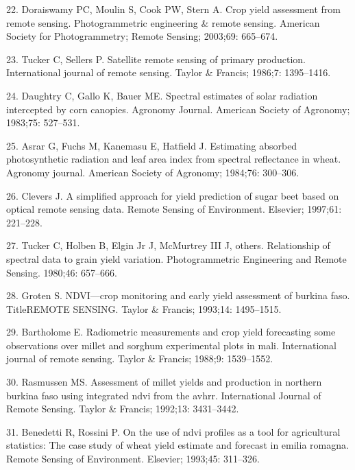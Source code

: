 \documentclass[10pt,letterpaper]{article}
\begin{document}
\hypertarget{ref-doraiswamy2003crop}{}
22. Doraiswamy PC, Moulin S, Cook PW, Stern A. Crop yield assessment
from remote sensing. Photogrammetric engineering \& remote sensing.
American Society for Photogrammetry; Remote Sensing; 2003;69: 665--674.

\hypertarget{ref-tucker1986satellite}{}
23. Tucker C, Sellers P. Satellite remote sensing of primary production.
International journal of remote sensing. Taylor \& Francis; 1986;7:
1395--1416.

\hypertarget{ref-daughtry1983spectral}{}
24. Daughtry C, Gallo K, Bauer ME. Spectral estimates of solar radiation
intercepted by corn canopies. Agronomy Journal. American Society of
Agronomy; 1983;75: 527--531.

\hypertarget{ref-asrar1984estimating}{}
25. Asrar G, Fuchs M, Kanemasu E, Hatfield J. Estimating absorbed
photosynthetic radiation and leaf area index from spectral reflectance
in wheat. Agronomy journal. American Society of Agronomy; 1984;76:
300--306.

\hypertarget{ref-clevers1997simplified}{}
26. Clevers J. A simplified approach for yield prediction of sugar beet
based on optical remote sensing data. Remote Sensing of Environment.
Elsevier; 1997;61: 221--228.

\hypertarget{ref-tucker1980relationship}{}
27. Tucker C, Holben B, Elgin Jr J, McMurtrey III J, others.
Relationship of spectral data to grain yield variation. Photogrammetric
Engineering and Remote Sensing. 1980;46: 657--666.

\hypertarget{ref-groten1993ndvi}{}
28. Groten S. NDVI---crop monitoring and early yield assessment of
burkina faso. TitleREMOTE SENSING. Taylor \& Francis; 1993;14:
1495--1515.

\hypertarget{ref-bartholome1988radiometric}{}
29. Bartholome E. Radiometric measurements and crop yield forecasting
some observations over millet and sorghum experimental plots in mali.
International journal of remote sensing. Taylor \& Francis; 1988;9:
1539--1552.

\hypertarget{ref-rasmussen1992assessment}{}
30. Rasmussen MS. Assessment of millet yields and production in northern
burkina faso using integrated ndvi from the avhrr. International Journal
of Remote Sensing. Taylor \& Francis; 1992;13: 3431--3442.

\hypertarget{ref-benedetti1993use}{}
31. Benedetti R, Rossini P. On the use of ndvi profiles as a tool for
agricultural statistics: The case study of wheat yield estimate and
forecast in emilia romagna. Remote Sensing of Environment. Elsevier;
1993;45: 311--326.
\end{document}
